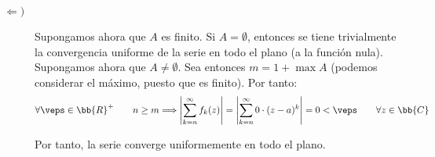 \begin{ejercicio}
\begin{description}
        \item[$\Longleftarrow)$] Supongamos ahora que $A$ es finito. Si $A=\emptyset$, entonces se tiene trivialmente la convergencia uniforme de la serie en todo el plano (a la función nula). Supongamos ahora que $A\neq \emptyset$. Sea entonces $m=1+\max A$ (podemos considerar el máximo, puesto que es finito). Por tanto:
        \begin{equation*}
            \forall \veps\in \bb{R}^+\qquad n\geq m\Longrightarrow \left|\sum_{k=n}^\infty f_k(z)\right| = \left|\sum_{k=n}^\infty 0\cdot (z-a)^k\right| = 0 < \veps\qquad \forall z\in \bb{C}
        \end{equation*}

        Por tanto, la serie converge uniformemente en todo el plano.
    \end{description}
\end{ejercicio}

